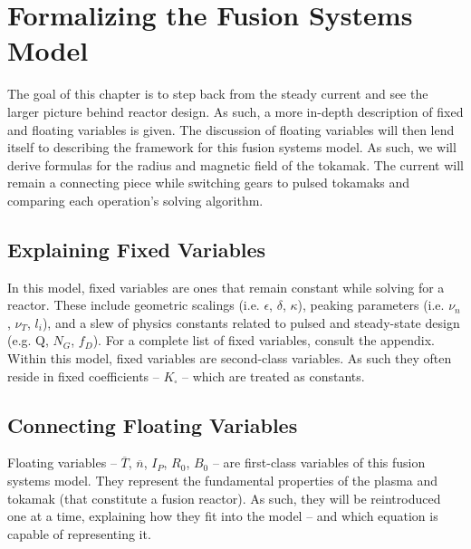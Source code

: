 %
%
%
%
%
%
%
%

\chapter{Formalizing the Fusion Systems Model}

The goal of this chapter is to step back from the steady current and see the larger picture behind reactor design. As such, a more in-depth description of fixed and floating variables is given. The discussion of floating variables will then lend itself to describing the framework for this fusion systems model. As such, we will derive formulas for the radius and magnetic field of the tokamak. The current will remain a connecting piece while switching gears to pulsed tokamaks and comparing each operation's solving algorithm.

\section{Explaining Fixed Variables} 

In this model, fixed variables are ones that remain constant while solving for a reactor. These include geometric scalings (i.e. $\epsilon$, $\delta$, $\kappa$), peaking parameters (i.e. $\nu_n$, $\nu_T$, $l_i$), and a slew of physics constants related to pulsed and steady-state design (e.g. Q, $N_G$, $f_D$). For a complete list of fixed variables, consult the appendix. Within this model, fixed variables are second-class variables. As such they often reside in fixed coefficients -- $K_\square$ -- which are treated as constants.

\section{Connecting Floating Variables}

Floating variables -- $\overline T$, $\overline n$, $I_P$, $R_0$, $B_0$ -- are first-class variables of this fusion systems model. They represent the fundamental properties of the plasma and tokamak (that constitute a fusion reactor). As such, they will be reintroduced one at a time, explaining how they fit into the model -- and which equation is capable of representing it.

